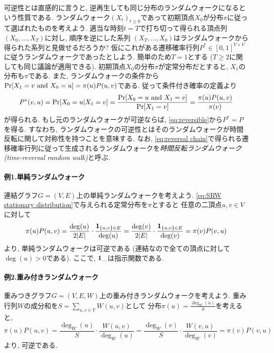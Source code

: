 可逆性とは直感的に言うと, 逆再生しても同じ分布のランダムウォークになるという性質である.
ランダムウォーク$(X_t)_{t\ge 0}$であって初期頂点$X_0$が分布$\pi$に従って選ばれたものを考えよう.
適当な時刻$t=T$で打ち切って得られる頂点列$(X_0,\dots,X_T)$に対し, 順序を逆にした系列
$(X_T,\dots,X_0)$はランダムウォークから得られた系列と見做せるだろうか?
仮にこれがある遷移確率行列$P^*\in[0,1]^{V\times V}$に従うランダムウォークであったとしよう.
簡単のため$T=1$とする ($T\ge 2$に関しても同じ議論が適用できる).
初期頂点$X_0$の分布$\pi$が定常分布だとすると, $X_1$の分布も$\pi$である.
また, ランダムウォークの条件から$\Pr[X_1 = v \text{ and } X_0=u] = \pi(u)P(u,v)$である.
従って条件付き確率の定義より
\begin{align}
    P^*(v,u) = \Pr[X_0 = u | X_1 = v] = \frac{\Pr[X_0 = u \text{ and } X_1 = v]}{\Pr[X_1 = v]} = \frac{\pi(u)P(u,v)}{\pi(v)} \label{eq:reversal chain}
\end{align}
が得られる.
もし元のランダムウォークが可逆ならば, \cref{eq:reversible}から$P^*=P$を得る.
すなわち, ランダムウォークの可逆性とはそのランダムウォークが時間反転に関して対称性を持つことを意味する.
なお, \cref{eq:reversal chain}で得られる遷移確率行列に従って生成されるランダムウォークを\emph{時間反転ランダムウォーク (time-reversal random walk)}と呼ぶ.

\paragraph*{例1.単純ランダムウォーク}
連結グラフ$G=(V,E)$上の単純ランダムウォークを考えよう.
\cref{eq:SRW stationary distribution}で与えられる定常分布を$\pi$とすると
任意の二頂点$u,v\in V$に対して
\[
    \pi(u) P(u,v) = \frac{\deg(u)}{2|E|} \cdot \frac{\mathbf{1}_{\{u,v\}\in E}}{\deg(u)}
    = \frac{\deg(v)}{2|E|} \cdot \frac{\mathbf{1}_{\{u,v\}\in E}}{\deg(v)}
    = \pi(v) P(v,u)
\]
より, 単純ランダムウォークは可逆である (連結なので全ての頂点に対して$\deg(u)>0$である).
ここで, $\mathbf{1}_{\dots}$は指示関数である.

\paragraph*{例2.重み付きランダムウォーク}
重みつきグラフ$G=(V,E,W)$上の重み付きランダムウォークを考えよう.
重み行列$W$の成分和を$S=\sum_{u,v\in V} W(u,v)$として
分布$\pi(u) = \frac{\deg_W(u)}{S}$を考えると,
\[
    \pi(u) P(u,v) = \frac{\deg_W(u)}{S} \cdot \frac{W(u,v)}{\deg_W(u)}
    = \frac{\deg_W(v)}{S} \cdot \frac{W(v,u)}{\deg_W(v)}
    = \pi(v) P(v,u)
\]
より, 可逆である.

